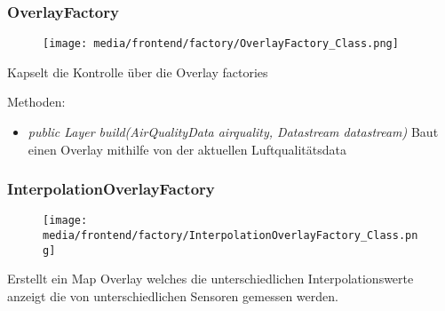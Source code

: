 \subsubsection{OverlayFactory}
\begin{minipage}{0.3\textwidth}
    \begin{figure}[H]
        \texttt{[image: media/frontend/factory/OverlayFactory\_Class.png]}
    \end{figure}
    \end{minipage} \hfill
    \begin{minipage}{0.6\textwidth}
Kapselt die Kontrolle über die Overlay factories
\end{minipage}

Methoden:
\begin{itemize} 
    \item \emph{public Layer build(AirQualityData airquality,  Datastream datastream)}  Baut einen Overlay mithilfe von der aktuellen Luftqualitätsdata
\end{itemize}

\subsubsection{InterpolationOverlayFactory}
\begin{minipage}{0.3\textwidth}
    \begin{figure}[H]
        \texttt{[image: media/frontend/factory/InterpolationOverlayFactory\_Class.png]}
    \end{figure}
    \end{minipage} \hfill
    \begin{minipage}{0.6\textwidth}
Erstellt ein Map Overlay welches die unterschiedlichen Interpolationswerte anzeigt die von unterschiedlichen Sensoren gemessen werden.
\end{minipage}

